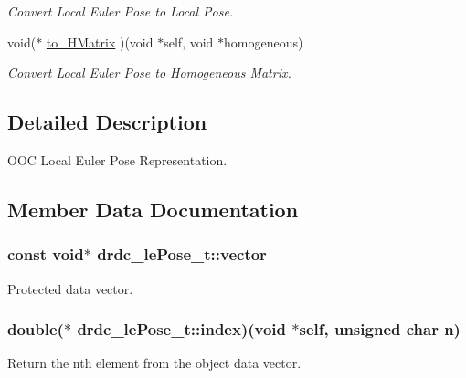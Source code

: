 \begin{CompactItemize}
\begin{CompactList}\small\item\em Convert Local Euler Pose to Local Pose. \item\end{CompactList}\item 
void($\ast$ \hyperlink{structdrdc__lePose__t_00b46359c3bda2c6cd2c15628d193ce1}{to\_\-HMatrix} )(void $\ast$self, void $\ast$homogeneous)
\begin{CompactList}\small\item\em Convert Local Euler Pose to Homogeneous Matrix. \item\end{CompactList}\end{CompactItemize}


\subsection{Detailed Description}
OOC Local Euler Pose Representation. 



\subsection{Member Data Documentation}
\hypertarget{structdrdc__lePose__t_d106d91986354f0113a06bc1b3bddd1f}{
\subsubsection[vector]{\setlength{\rightskip}{0pt plus 5cm}const void$\ast$ {\bf drdc\_\-lePose\_\-t::vector}}}
\label{structdrdc__lePose__t_d106d91986354f0113a06bc1b3bddd1f}


Protected data vector. 

\hypertarget{structdrdc__lePose__t_a4140fbb8270978861d42f119d1b0218}{
\subsubsection[index]{\setlength{\rightskip}{0pt plus 5cm}double($\ast$ {\bf drdc\_\-lePose\_\-t::index})(void $\ast$self, unsigned char n)}}
\label{structdrdc__lePose__t_a4140fbb8270978861d42f119d1b0218}


Return the nth element from the object data vector. 

